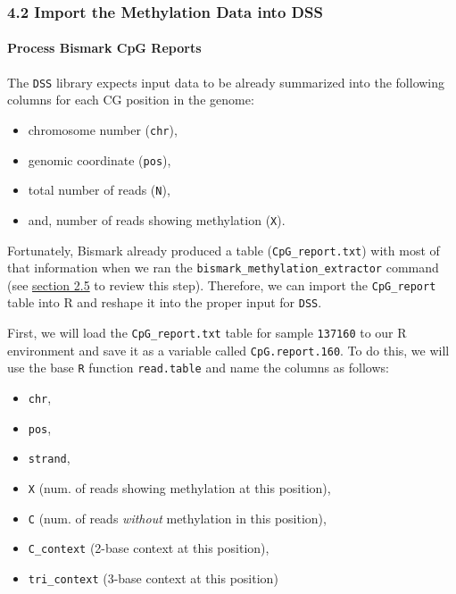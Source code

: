 \documentclass[
]{book}
\providecommand{\tightlist}{%
  \setlength{\itemsep}{0pt}\setlength{\parskip}{0pt}}
\begin{document}
\subsubsection{4.2 Import the Methylation Data into DSS}\label{import-the-methylation-data-into-dss}

\paragraph{Process Bismark CpG Reports}\label{process-bismark-cpg-reports}

The \texttt{DSS} library expects input data to be already summarized into the following columns for each CG position in the genome:

\begin{itemize}
\tightlist
\item
  chromosome number (\texttt{chr}),
\item
  genomic coordinate (\texttt{pos}),
\item
  total number of reads (\texttt{N}),
\item
  and, number of reads showing methylation (\texttt{X}).
\end{itemize}

Fortunately, Bismark already produced a table (\texttt{CpG\_report.txt}) with most of that information when we ran the \texttt{bismark\_methylation\_extractor} command (see \hyperref[methylation_profiles]{section 2.5} to review this step). Therefore, we can import the \texttt{CpG\_report} table into R and reshape it into the proper input for \texttt{DSS}.

First, we will load the \texttt{CpG\_report.txt} table for sample \texttt{137160} to our R environment and save it as a variable called \texttt{CpG.report.160}. To do this, we will use the base \texttt{R} function \texttt{read.table} and name the columns as follows:

\begin{itemize}
\tightlist
\item
  \texttt{chr},
\item
  \texttt{pos},
\item
  \texttt{strand},
\item
  \texttt{X} (num. of reads showing methylation at this position),
\item
  \texttt{C} (num. of reads \emph{without} methylation in this position),
\item
  \texttt{C\_context} (2-base context at this position),
\item
  \texttt{tri\_context} (3-base context at this position)
\end{itemize}
\end{document}
